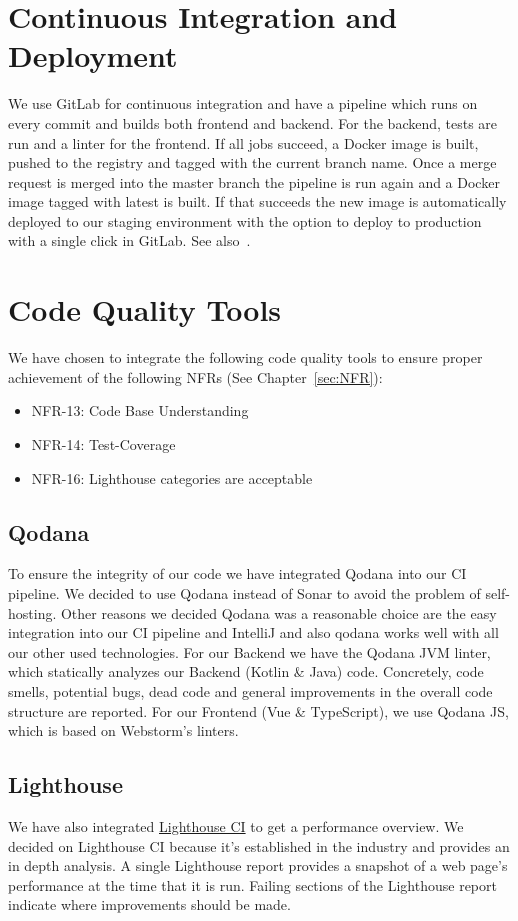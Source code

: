 \section{Continuous Integration and Deployment}
We use GitLab for continuous integration and have a pipeline which runs on every commit and builds both frontend and backend.
For the backend, tests are run and a linter for the frontend.
If all jobs succeed, a Docker image is built, pushed to the registry and tagged with the current branch name.
Once a merge request is merged into the master branch the pipeline is run again and a Docker image tagged with latest is built.
If that succeeds the new image is automatically deployed to our staging environment with the option to deploy to production with a single click in GitLab.
See also~.

\section{Code Quality Tools}
We have chosen to integrate the following code quality tools to ensure proper achievement of the following NFRs (See Chapter~\ref{sec:NFR}):
\begin{itemize}
    \item NFR-13: Code Base Understanding
    \item NFR-14: Test-Coverage
    \item NFR-16: Lighthouse categories are acceptable
\end{itemize}

\subsection{Qodana}
To ensure the integrity of our code we have integrated Qodana into our CI pipeline.
We decided to use Qodana instead of Sonar to avoid the problem of self-hosting.
Other reasons we decided Qodana was a reasonable choice are the easy integration into our CI pipeline and IntelliJ and also qodana works well with all our other used technologies.
For our Backend we have the Qodana JVM linter, which statically analyzes our Backend (Kotlin \& Java) code.
Concretely, code smells, potential bugs, dead code and general improvements in the overall code structure are reported.
For our Frontend (Vue \& TypeScript), we use Qodana JS, which is based on Webstorm's linters.

\subsection{Lighthouse}
We have also integrated \href{https://github.com/GoogleChrome/lighthouse-ci}{Lighthouse CI} to get a performance overview.
We decided on Lighthouse CI because it's established in the industry and provides an in depth analysis.
A single Lighthouse report provides a snapshot of a web page's performance at the time that it is run.
Failing sections of the Lighthouse report indicate where improvements should be made.

